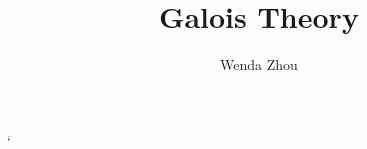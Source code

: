 \documentclass[a4paper]{scrreprt}
\title{Galois Theory}
\author{Wenda Zhou}
\begin{document}
\maketitle
`



\end{document}
